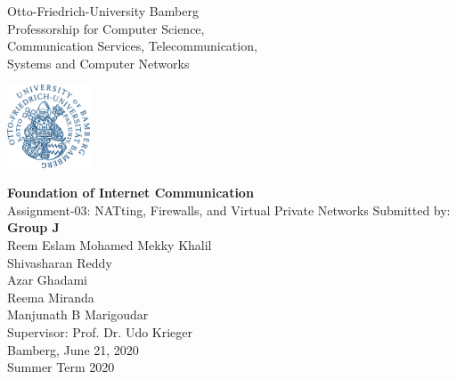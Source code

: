 
\thispagestyle{empty}
\begin{center}
\begin{minipage}{0.7\textwidth}
\centering
\footnotesize{Otto-Friedrich-University Bamberg}\\
	\vspace{0.3cm}
\normalsize{Professorship for Computer Science,
	\\Communication Services, Telecommunication,
 	\\Systems and Computer Networks}
\end{minipage}
\begin{minipage}{0.1\textwidth}\raggedleft
\includegraphics[width=70pt]{Images/UMI-LOGO.png}
\end{minipage}




	


	\vspace{1cm}
	\doublespacing
	{\textbf{Foundation of Internet Communication}}\\
	\singlespacing
	{\normalsize{Assignment-03: NATting, Firewalls, and Virtual Private Networks}}
    \vfill
    \footnotesize{Submitted by:}\\
    \textbf{Group J}\\
    \vspace{0.5cm}
     \normalsize{Reem Eslam Mohamed Mekky Khalil}\\
      \normalsize{Shivasharan Reddy}\\
     \normalsize{Azar Ghadami}\\
     \normalsize{Reema Miranda}\\
     \normalsize{Manjunath B Marigoudar}\\

     \vspace{0.5cm}
     \small{Supervisor: Prof. Dr. Udo Krieger}\\
     \vspace{0.5cm}
     \footnotesize{Bamberg, June 21, 2020}\\
    \footnotesize{Summer Term 2020}
 

 
\end{center}
\clearpage

\clearpage
